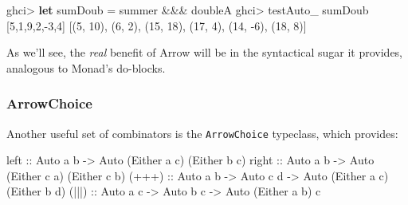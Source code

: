 \documentclass[]{article}
\newenvironment{Shaded}{}{}
\newcommand{\KeywordTok}[1]{\textcolor[rgb]{0.00,0.44,0.13}{\textbf{{#1}}}}
\newcommand{\DataTypeTok}[1]{\textcolor[rgb]{0.56,0.13,0.00}{{#1}}}
\newcommand{\DecValTok}[1]{\textcolor[rgb]{0.25,0.63,0.44}{{#1}}}
\newcommand{\OtherTok}[1]{\textcolor[rgb]{0.00,0.44,0.13}{{#1}}}
\newcommand{\FunctionTok}[1]{\textcolor[rgb]{0.02,0.16,0.49}{{#1}}}
\newcommand{\NormalTok}[1]{{#1}}
\begin{document}
\begin{Shaded}
\begin{Highlighting}[]
\NormalTok{ghci}\FunctionTok{>} \KeywordTok{let} \NormalTok{sumDoub }\FunctionTok{=} \NormalTok{summer }\FunctionTok{&&&} \NormalTok{doubleA}
\NormalTok{ghci}\FunctionTok{>} \NormalTok{testAuto_ sumDoub [}\DecValTok{5}\NormalTok{,}\DecValTok{1}\NormalTok{,}\DecValTok{9}\NormalTok{,}\DecValTok{2}\NormalTok{,}\FunctionTok{-}\DecValTok{3}\NormalTok{,}\DecValTok{4}\NormalTok{]}
\NormalTok{[(}\DecValTok{5}\NormalTok{, }\DecValTok{10}\NormalTok{), (}\DecValTok{6}\NormalTok{, }\DecValTok{2}\NormalTok{), (}\DecValTok{15}\NormalTok{, }\DecValTok{18}\NormalTok{), (}\DecValTok{17}\NormalTok{, }\DecValTok{4}\NormalTok{), (}\DecValTok{14}\NormalTok{, }\FunctionTok{-}\DecValTok{6}\NormalTok{), (}\DecValTok{18}\NormalTok{, }\DecValTok{8}\NormalTok{)]}
\end{Highlighting}
\end{Shaded}

As we'll see, the \emph{real} benefit of Arrow will be in the
syntactical sugar it provides, analogous to Monad's do-blocks.

\subsubsection{ArrowChoice}\label{arrowchoice}

Another useful set of combinators is the \texttt{ArrowChoice} typeclass,
which provides:

\begin{Shaded}
\begin{Highlighting}[]
\OtherTok{left  ::} \DataTypeTok{Auto} \NormalTok{a b }\OtherTok{->} \DataTypeTok{Auto} \NormalTok{(}\DataTypeTok{Either} \NormalTok{a c) (}\DataTypeTok{Either} \NormalTok{b c)}
\OtherTok{right ::} \DataTypeTok{Auto} \NormalTok{a b }\OtherTok{->} \DataTypeTok{Auto} \NormalTok{(}\DataTypeTok{Either} \NormalTok{c a) (}\DataTypeTok{Either} \NormalTok{c b)}
\OtherTok{(+++) ::} \DataTypeTok{Auto} \NormalTok{a b }\OtherTok{->} \DataTypeTok{Auto} \NormalTok{c d }\OtherTok{->} \DataTypeTok{Auto} \NormalTok{(}\DataTypeTok{Either} \NormalTok{a c) (}\DataTypeTok{Either} \NormalTok{b d)}
\OtherTok{(|||) ::} \DataTypeTok{Auto} \NormalTok{a c }\OtherTok{->} \DataTypeTok{Auto} \NormalTok{b c }\OtherTok{->} \DataTypeTok{Auto} \NormalTok{(}\DataTypeTok{Either} \NormalTok{a b) c}
\end{Highlighting}
\end{Shaded}
\end{document}
